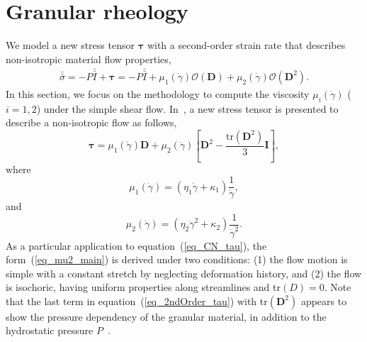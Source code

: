 \section{Granular rheology}
We model a new stress tensor $\bm \tau$ with a second-order strain rate that describes non-isotropic material flow properties,
\begin{align}
  \bar{\bar{\sigma}}
    = -P \bar{\bar{I}}  + \bm{\tau}
    =  -P \bar{\bar{I}}  
    + \mu_1(\dot{\gamma}) \mathcal{O}({\bm D})
    + \mu_2(\dot{\gamma}) \mathcal{O}({\bm D^2}).
  \end{align}
In this section, we focus on the methodology to compute the viscosity $\mu_i ({\dot{\gamma}})$ ($i = 1,2$) under the simple shear flow. 
In~\cite{srivastava_viscometric_2021}, a new stress tensor is presented to describe a non-isotropic flow as follows,
\begin{equation}
  {\bm {\bm \tau}}
  = \mu_1(\dot{\gamma}) {\bm D}
  +  
 \mu_2 (\dot{\gamma})
  \left[ {\bm D}^2  - \frac{\text{tr}\left({\bm D}^2\right)}{3}{\bm I} \right],
\label{eq_2ndOrder_tau}
\end{equation}
where 
\begin{equation}
  \mu_1 (\dot{\gamma})
   = \left( \eta_1 \dot{\gamma}+ \kappa_1 \right) \frac{1}{\dot{\gamma}},
\label{eq_mu1_main}
\end{equation}
and 
\begin{equation}
  \mu_2 (\dot{\gamma}) = 
  \left( \eta_2  \dot{\gamma}^2
  +  \kappa_2 
  \right) \frac{1}{\dot{\gamma}^2}.
  \label{eq_mu2_main}
\end{equation}
As a particular application to equation~(\ref{eq_CN_tau}), the form~(\ref{eq_mu2_main}) is derived under two conditions:
(1) the flow motion is simple with a constant stretch by neglecting deformation history, and (2) the flow is isochoric, having uniform properties along streamlines and tr$(D) = 0$. 
Note that the last term in equation~(\ref{eq_2ndOrder_tau}) with tr$\left( \bm D^2 \right)$ appears to show the pressure dependency of the granular material, in addition to the hydrostatic pressure $P$~\cite{rajagopal_implicit_2006}.



